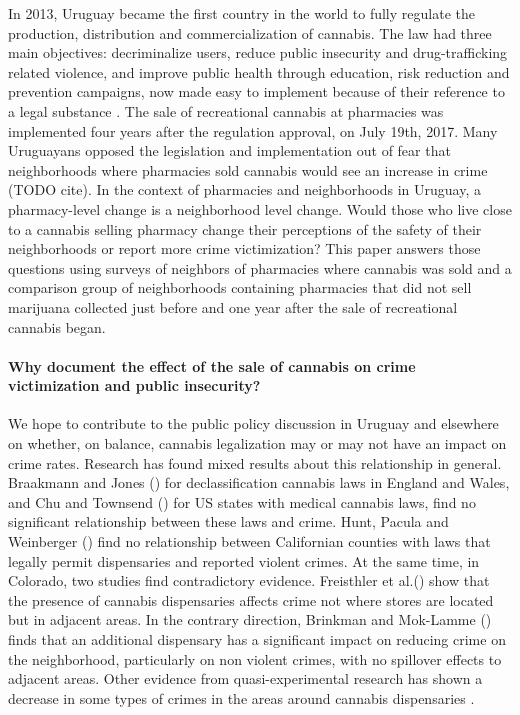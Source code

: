 \documentclass[11pt]{article}
\begin{document}
In 2013, Uruguay became the first country in the world to fully regulate the production, distribution and commercialization of cannabis. The law had three main objectives: decriminalize users, reduce public insecurity and drug-trafficking related violence, and improve public health through education, risk reduction and prevention campaigns, now made easy to implement because of their reference to a legal substance \citep{arraras2014inventando, pardo2014cannabis, queirolo2019uruguay}. The sale of recreational cannabis at pharmacies was implemented four years after the regulation approval, on July 19th, 2017. Many Uruguayans opposed the legislation and implementation out of fear that neighborhoods where pharmacies sold cannabis would see an increase in crime (TODO cite). In the context of pharmacies and neighborhoods in Uruguay, a pharmacy-level change is a neighborhood level change. Would those who live close to a cannabis selling pharmacy change their perceptions of the safety of their neighborhoods or report more crime victimization?  This paper answers those questions using surveys of neighbors of pharmacies where cannabis was sold and a comparison group of neighborhoods containing pharmacies that did not sell marijuana collected just before and one year after the sale of recreational cannabis began.

\paragraph{Why document the effect of the sale of cannabis on crime victimization and public insecurity?}

We hope to contribute to the public policy discussion in Uruguay and elsewhere on whether, on balance, cannabis legalization may or may not have an impact on crime rates. Research has found mixed results about this relationship in general. Braakmann and Jones (\citeyear{braakmann2014cannabis}) for declassification cannabis laws in England and Wales, and Chu and Townsend (\citeyear{chu2019joint}) for US states with medical cannabis laws, find no significant relationship between these laws and crime. Hunt, Pacula and Weinberger (\citeyear{hunt2018high}) find no relationship between Californian counties with laws that legally permit dispensaries and reported violent crimes. At the same time, in Colorado, two studies find contradictory evidence. Freisthler et al.(\citeyear{freisthler2016micro}) show that the presence of cannabis dispensaries affects crime not where stores are located but in adjacent areas. In the contrary direction, Brinkman and Mok-Lamme (\citeyear{brinkman2019not}) finds that an additional dispensary has a significant impact on reducing crime on the neighborhood, particularly on non violent crimes, with no spillover effects to adjacent areas.  Other evidence from  quasi-experimental research has shown a decrease in some types of crimes in the areas around cannabis dispensaries \citep{dragone2019crime, gavrilova2014legal, Indigo:2016}.
\end{document}

